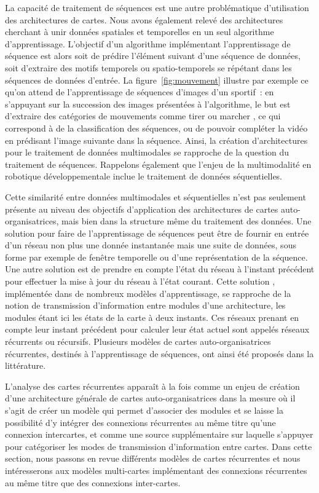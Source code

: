 \documentclass[../main]{subfiles}
\begin{document}
La capacité de traitement de séquences est une autre problématique d'utilisation des architectures de cartes. Nous avons également relevé des architectures cherchant à unir données spatiales et temporelles en un seul algorithme d'apprentissage. L'objectif d'un algorithme implémentant l'apprentissage de séquence est alors soit de prédire l'élément suivant d'une séquence de données, soit d'extraire des motifs temporels ou spatio-temporels se répétant dans les séquences de données d'entrée. 
La figure~\ref{fig:mouvement} illustre par exemple ce qu'on attend de l'apprentissage de séquences d'images d'un sportif~: en s'appuyant sur la succession des images présentées à l'algorithme, le but est d'extraire des catégories de mouvements comme \og tirer \fg{} ou \og marcher \fg{}, ce qui correspond à de la classification des séquences, ou de pouvoir compléter la vidéo en prédisant l'image suivante dans la séquence.
Ainsi, la création d'architectures pour le traitement de données multimodales se rapproche de la question du traitement de séquences. Rappelons également que l'enjeu de la multimodalité en robotique développementale inclue le traitement de données séquentielles.


Cette similarité entre données multimodales et séquentielles n'est pas seulement présente au niveau des objectifs d'application des architectures de cartes auto-organisatrices, mais bien dans la structure même du traitement des données. 
Une solution pour faire de l'apprentissage de séquences peut être de fournir en entrée d'un réseau non plus une donnée instantanée mais une suite de données, sous forme par exemple de fenêtre temporelle ou d'une représentation de la séquence.
Une autre solution est de prendre en compte l'état du réseau à l'instant précédent pour effectuer la mise à jour du réseau à l'état courant. 
Cette solution , implémentée dans de nombreux modèles d'apprentissage, se rapproche de la notion de transmission d'information entre modules d'une architecture, les modules étant ici les états de la carte à deux instants. Ces réseaux prenant en compte leur instant précédent pour calculer leur état actuel sont appelés réseaux récurrents ou récursifs.
Plusieurs modèles de cartes auto-organisatrices récurrentes, destinés à l'apprentissage de séquences, ont ainsi été proposés dans la littérature.

L'analyse des cartes récurrentes apparaît à la fois comme un enjeu de création d'une architecture générale de cartes auto-organisatrices dans la mesure où il s'agit de créer un modèle qui permet d'associer des modules et se laisse la possibilité d'y intégrer des connexions récurrentes au même titre qu'une connexion intercartes, et comme une source supplémentaire sur laquelle s'appuyer pour catégoriser les modes de transmission d'information entre cartes. Dans cette section, nous passons en revue différents modèles de cartes récurrentes et nous intéresserons aux modèles multi-cartes implémentant des connexions récurrentes au même titre que des connexions inter-cartes.
\end{document}
